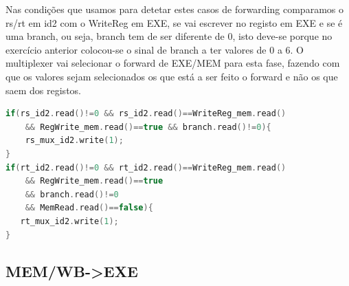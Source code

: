 \documentclass[pdftex,12pt,a4paper]{report}
\begin{document}
Nas condições que usamos para detetar estes casos de forwarding comparamos o rs/rt em id2 com o WriteReg em EXE, se vai escrever no registo em EXE e se é uma branch, ou seja, branch tem de ser diferente de 0, isto deve-se porque no exercício anterior colocou-se o sinal de branch a ter valores de 0 a 6. O multiplexer vai selecionar o forward de EXE/MEM para esta fase, fazendo com que os valores sejam selecionados os que está a ser feito o forward e não os que saem dos registos.

\begin{lstlisting}[language=c]
if(rs_id2.read()!=0 && rs_id2.read()==WriteReg_mem.read() 
	&& RegWrite_mem.read()==true && branch.read()!=0){
    rs_mux_id2.write(1);
}
if(rt_id2.read()!=0 && rt_id2.read()==WriteReg_mem.read() 
	&& RegWrite_mem.read()==true 
	&& branch.read()!=0 
	&& MemRead.read()==false){
   rt_mux_id2.write(1);
}
\end{lstlisting} 


\subsection{MEM/WB->EXE}

\begin{table}[!htb]
\centering
\label{my-label}
\end{table}
\end{document}
